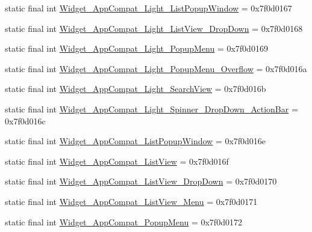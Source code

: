 \begin{DoxyCompactItemize}
static final int \mbox{\hyperlink{classcom_1_1google_1_1android_1_1gms_1_1R_1_1style_af84b00dbfcac02d1bd6a8406a942aa40}{Widget\+\_\+\+App\+Compat\+\_\+\+Light\+\_\+\+List\+Popup\+Window}} = 0x7f0d0167
\item 
static final int \mbox{\hyperlink{classcom_1_1google_1_1android_1_1gms_1_1R_1_1style_a910e2ac256b514fb2b01f478c6671349}{Widget\+\_\+\+App\+Compat\+\_\+\+Light\+\_\+\+List\+View\+\_\+\+Drop\+Down}} = 0x7f0d0168
\item 
static final int \mbox{\hyperlink{classcom_1_1google_1_1android_1_1gms_1_1R_1_1style_ad3a385587ee54a34950f1b6414d252e4}{Widget\+\_\+\+App\+Compat\+\_\+\+Light\+\_\+\+Popup\+Menu}} = 0x7f0d0169
\item 
static final int \mbox{\hyperlink{classcom_1_1google_1_1android_1_1gms_1_1R_1_1style_a6e9a340faf8008e9beacf7e4afd57924}{Widget\+\_\+\+App\+Compat\+\_\+\+Light\+\_\+\+Popup\+Menu\+\_\+\+Overflow}} = 0x7f0d016a
\item 
static final int \mbox{\hyperlink{classcom_1_1google_1_1android_1_1gms_1_1R_1_1style_a3a6c89e1553a0308a49d3196c79dc7a4}{Widget\+\_\+\+App\+Compat\+\_\+\+Light\+\_\+\+Search\+View}} = 0x7f0d016b
\item 
static final int \mbox{\hyperlink{classcom_1_1google_1_1android_1_1gms_1_1R_1_1style_a53f8de5a3073238cb0b32d94429a87a3}{Widget\+\_\+\+App\+Compat\+\_\+\+Light\+\_\+\+Spinner\+\_\+\+Drop\+Down\+\_\+\+Action\+Bar}} = 0x7f0d016c
\item 
static final int \mbox{\hyperlink{classcom_1_1google_1_1android_1_1gms_1_1R_1_1style_a55eebc0f3df39de5aa4455df72a86ff8}{Widget\+\_\+\+App\+Compat\+\_\+\+List\+Popup\+Window}} = 0x7f0d016e
\item 
static final int \mbox{\hyperlink{classcom_1_1google_1_1android_1_1gms_1_1R_1_1style_a9f37c0f145fe5b1b126f1a2b600a2cc1}{Widget\+\_\+\+App\+Compat\+\_\+\+List\+View}} = 0x7f0d016f
\item 
static final int \mbox{\hyperlink{classcom_1_1google_1_1android_1_1gms_1_1R_1_1style_a1723177bab72eab1c348426d456a02cb}{Widget\+\_\+\+App\+Compat\+\_\+\+List\+View\+\_\+\+Drop\+Down}} = 0x7f0d0170
\item 
static final int \mbox{\hyperlink{classcom_1_1google_1_1android_1_1gms_1_1R_1_1style_a3145b4c40d466a931e60d439ae0c11c6}{Widget\+\_\+\+App\+Compat\+\_\+\+List\+View\+\_\+\+Menu}} = 0x7f0d0171
\item 
static final int \mbox{\hyperlink{classcom_1_1google_1_1android_1_1gms_1_1R_1_1style_a6be5cb6736b5717f97b4774153bcf612}{Widget\+\_\+\+App\+Compat\+\_\+\+Popup\+Menu}} = 0x7f0d0172

\end{DoxyCompactItemize}

